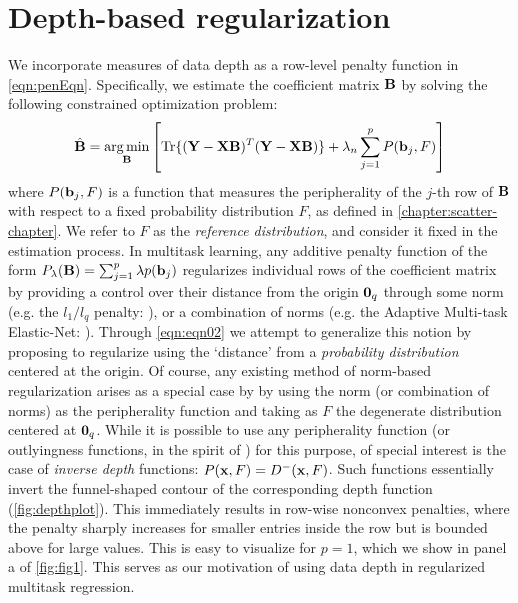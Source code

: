 \section{Depth-based regularization}
\label{sec:regression-sec2}
We incorporate measures of data depth as a row-level penalty function in \ref{eqn:penEqn}. Specifically, we estimate the coefficient matrix ${\mathbf{B}}$ by solving the following constrained optimization problem:
%
\begin{equation}\label{eqn:eqn02}
\hat{{\mathbf{B}}} = \operatorname*{arg\,min}_{\mathbf{B}} \left[ \operatorname*{Tr} \{ ({\mathbf{Y}} - {\mathbf{X}}{\mathbf{B}})^T ( {\mathbf{Y}} - {\mathbf{X}}{\mathbf{B}}) \} + \lambda_n \sum_{j=1}^p P ( {\bf{b}}_j, F) \right]
\end{equation}
%
where $P ( {\bf{b}}_j, F)$ is a function that measures the peripherality of the $j$-th row of ${\mathbf{B}}$ with respect to a fixed probability distribution $F$, as defined in \ref{chapter:scatter-chapter}. We refer to $F$ as the \textit{reference distribution}, and consider it fixed in the estimation process. In multitask learning, any additive penalty function of the form $P_\lambda ({\mathbf{B}}) = \sum_{j=1}^p \lambda p( {\bf{b}}_j)$ regularizes individual rows of the coefficient matrix by providing a control over their distance from the origin ${\bf 0}_q$ through some norm (e.g. the $l_1/l_q$ penalty: \cite{NeghabanWainwright11}), or a combination of norms (e.g. the Adaptive Multi-task Elastic-Net: \cite{ChenEtal12}). Through \ref{eqn:eqn02} we attempt to generalize this notion by proposing to regularize using the `distance' from a \textit{probability distribution} centered at the origin. Of course, any existing method of norm-based regularization arises as a special case by by using the norm (or combination of norms) as the peripherality function and taking as $F$ the degenerate distribution centered at ${\bf 0}_q$. While it is possible to use any peripherality function (or outlyingness functions, in the spirit of \cite{zuo00}) for this purpose, of special interest is the case of \textit{inverse depth} functions: $P({\bf{x}}, F) = D^- ({\bf{x}}, F)$. Such functions essentially invert the funnel-shaped contour of the corresponding depth function (\ref{fig:depthplot}). This immediately results in row-wise nonconvex penalties, where the penalty sharply increases for smaller entries inside the row but is bounded above for large values. This is easy to visualize for $p=1$, which we show in panel a of \ref{fig:fig1}. This serves as our motivation of using data depth in regularized multitask regression.